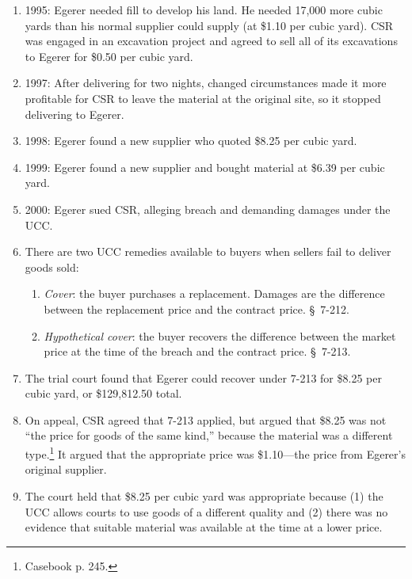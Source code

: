 \begin{enumerate}
    \item 1995: Egerer needed fill to develop his land. He needed 17,000 more cubic 
    yards than his normal supplier could supply (at \$1.10 per cubic yard). 
    CSR was engaged in an excavation project and agreed to sell all of its 
    excavations to Egerer for \$0.50 per cubic yard.
    \item 1997: After delivering for two nights, changed circumstances made it 
    more 
    profitable for CSR to leave the material at the original site, so it 
    stopped delivering to Egerer.
    \item 1998: Egerer found a new supplier who quoted \$8.25 per cubic yard.
    \item 1999: Egerer found a new supplier and bought material at \$6.39 per 
    cubic yard.
    \item 2000: Egerer sued CSR, alleging breach and demanding damages under 
    the UCC.
    \item There are two UCC remedies available to buyers when sellers fail to 
    deliver goods sold:
    \begin{enumerate}
        \item \emph{Cover}: the buyer purchases a replacement. Damages are the 
        difference between the replacement price and the contract price. \S\ 
        7-212.
        \item \emph{Hypothetical cover}: the buyer recovers the difference 
        between the market price at the time of the breach and the contract 
        price. \S\ 7-213.
    \end{enumerate}
    \item The trial court found that Egerer could recover under 7-213 for 
    \$8.25 per cubic yard, or \$129,812.50 total.
    \item On appeal, CSR agreed that 7-213 applied, but argued that \$8.25 was 
    not ``the price for goods of the same kind,'' because the material was a 
    different type.\footnote{Casebook p. 245.} It argued that the appropriate 
    price was \$1.10---the price from Egerer's original supplier.
    \item The court held that \$8.25 per cubic yard was appropriate because 
    (1) the UCC allows courts to use goods of a different quality and (2) 
    there was no evidence that suitable material was available at the time at 
    a lower price.
\end{enumerate}

